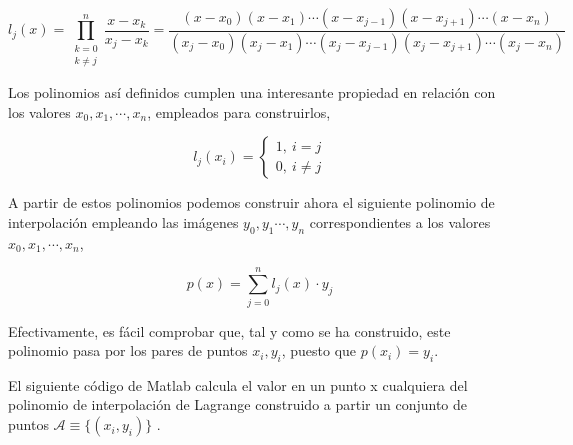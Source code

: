 \begin{equation*}
l_j(x)=\prod_{\substack{k=0\\
k\neq j}}^n\frac{x-x_k}{x_j-x_k}=\frac{(x-x_0)(x-x_1)\cdots(x-x_{j-1})(x-x_{j+1})\cdots(x-x_n)}{(x_j-x_0)(x_j-x_1)\cdots(x_j-x_{j-1})(x_j-x_{j+1})\cdots(x_j-x_n)}
\end{equation*}
\begin{paracol}{2}
Los polinomios así definidos cumplen una interesante propiedad en  relación con los valores $x_0, x_1,\cdots, x_n$, empleados para construirlos,
\end{paracol}
\begin{equation*}
l_j(x_i)= \left\{ 
\begin{aligned}
1,\ i=j\\
0,\ i\neq j
\end{aligned}
\right.
\end{equation*}
\begin{paracol}{2}
A partir de estos polinomios podemos construir ahora el siguiente polinomio de interpolación empleando las imágenes $y_0,y_1\cdots, y_n$ correspondientes a los valores $x_0, x_1,\cdots, x_n$,
\end{paracol}
\begin{equation*}
p(x)=\sum_{j=0}^n l_j(x)\cdot y_j
\end{equation*}
\begin{paracol}{2}
Efectivamente, es fácil comprobar que, tal y como se ha construido, este polinomio pasa por los pares de puntos $x_i,y_i$, puesto que $p(x_i)=y_i$.

El siguiente código de Matlab calcula el valor en un punto x cualquiera del polinomio de interpolación de Lagrange construido a partir un conjunto de puntos $\mathcal{A}\equiv \{(x_i,y_i)\}$ . 
\end{paracol}


    
